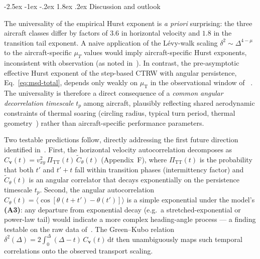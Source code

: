 \documentclass[11pt,a4paper]{article}
\makeatletter
\renewcommand\section{\@startsection{section}{1}{\z@}%
  {-2.5ex \@plus -1ex \@minus -.2ex}%
  {1.8ex \@plus.2ex}%
  {\normalfont\normalsize\bfseries\centering}}
\makeatother
\begin{document}
\section{Discussion and outlook}
\label{sec:discussion}

The universality of the empirical Hurst exponent is \emph{a priori}
surprising: the three aircraft classes differ by factors of $3.6$
in horizontal velocity and $1.8$ in the transition tail exponent.
A naive application of the L\'evy-walk scaling $\delta^2 \sim
\Delta^{4-\mu}$ to the aircraft-specific $\mu_T$ values would imply
aircraft-specific Hurst exponents, inconsistent with observation
(as noted in~\cite{vilpellet2026}). In contrast, the
pre-asymptotic effective Hurst exponent of the step-based CTRW
with angular persistence, Eq.~\eqref{eq:msd-total}, depends only
weakly on $\mu_{\mathrm{T}}$ in the observational window of
~\cite{vilpellet2026}. The universality is therefore a direct
consequence of a \emph{common angular decorrelation timescale}
$t_p$ among aircraft, plausibly reflecting shared aerodynamic
constraints of thermal soaring (circling radius, typical turn
period, thermal geometry~\cite{reichmann1993}) rather than
aircraft-specific performance parameters.

Two testable predictions follow, directly addressing the first
future direction identified in~\cite{vilpellet2026}. First, the
horizontal velocity autocorrelation decomposes as
$C_{\mathbf{v}}(t) = v_{xy}^2\,\Pi_{\mathrm{TT}}(t)\,
\widetilde{C}_\theta(t)$ (Appendix~F), where
$\Pi_{\mathrm{TT}}(t)$ is the probability that both $t'$ and
$t'+t$ fall within transition phases (intermittency factor) and
$\widetilde{C}_\theta(t)$ is an angular correlator that decays
exponentially on the persistence timescale $t_p$. Second, the
angular autocorrelation $C_\theta(t) = \langle\cos[\theta(t+t')-
\theta(t')]\rangle$ is a simple exponential under the model's
\textbf{(A3)}: any departure from exponential decay (e.g.\ a
stretched-exponential or power-law tail) would indicate a more
complex heading-angle process --- a finding testable on the raw
data of~\cite{vilpellet2026}. The
Green--Kubo relation~\cite{kubo1985}
$\delta^2(\Delta) = 2\int_0^\Delta (\Delta-t)\,C_{\mathbf{v}}(t)\,
\mathrm{d}t$ then unambiguously maps such temporal correlations
onto the observed transport scaling.
\end{document}
